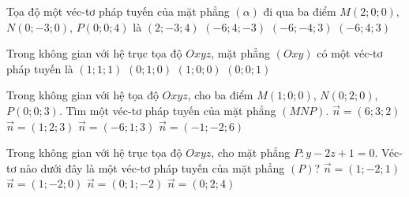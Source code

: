 \begin{ex}%
	Tọa độ một véc-tơ pháp tuyến của mặt phẳng $ (\alpha)$ đi qua ba điểm $M(2;0;0)$, $N(0;-3;0)$, $P(0;0;4)$ là     
	\choice
	{$(2;-3;4)$}
	{\True $(-6;4;-3)$}
	{$(-6;-4;3)$}
	{$(-6;4;3)$}
\end{ex}
\begin{ex}%
	Trong không gian với hệ trục tọa độ $Oxyz$, mặt phẳng $(Oxy)$ có một véc-tơ pháp tuyến là
	\choice
	{$(1;1;1)$}
	{$(0;1;0)$}
	{$(1;0;0)$}
	{\True $(0;0;1)$}
\end{ex}
\begin{ex}%
	Trong không gian với hệ tọa độ $Oxyz$, cho ba điểm $M(1;0;0)$, $N(0;2;0)$, $P(0;0;3)$. Tìm một véc-tơ pháp tuyến của mặt phẳng $(MNP)$.
	\choice
	{\True $\vec{n}=(6;3;2)$}
	{$\vec{n}=(1;2;3)$}
	{$\vec{n}=(-6;1;3)$}
	{$\vec{n}=(-1;-2;6)$}
\end{ex}
\begin{ex}%
	Trong không gian với hệ trục tọa độ $Oxyz$, cho mặt phẳng $P \colon y-2z+1=0$. Véc-tơ nào dưới đây là một véc-tơ pháp tuyến của mặt phẳng $(P)$?
	\choice
	{ $\vec{n}=(1;-2;1)$}
	{$ \vec{n}=(1;-2;0)$}
	{\True $  \vec{n}=(0;1;-2)$}
	{$ \vec{n}=(0;2;4)$}
\end{ex}
